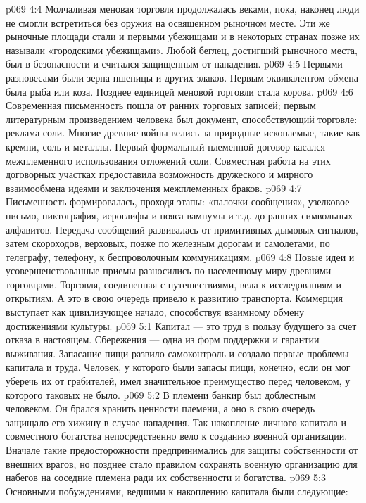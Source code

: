 \vs p069 4:4 Молчаливая меновая торговля продолжалась веками, пока, наконец люди не смогли встретиться без оружия на освященном рыночном месте. Эти же рыночные площади стали и первыми убежищами и в некоторых странах позже их называли «городскими убежищами». Любой беглец, достигший рыночного места, был в безопасности и считался защищенным от нападения.
\vs p069 4:5 \pc Первыми разновесами были зерна пшеницы и других злаков. Первым эквивалентом обмена была рыба или коза. Позднее единицей меновой торговли стала корова.
\vs p069 4:6 Современная письменность пошла от ранних торговых записей; первым литературным произведением человека был документ, способствующий торговле: реклама соли. Многие древние войны велись за природные ископаемые, такие как кремни, соль и металлы. Первый формальный племенной договор касался межплеменного использования отложений соли. Совместная работа на этих договорных участках предоставила возможность дружеского и мирного взаимообмена идеями и заключения межплеменных браков.
\vs p069 4:7 Письменность формировалась, проходя этапы: «палочки\hyp{}сообщения», узелковое письмо, пиктография, иероглифы и пояса\hyp{}вампумы и т.д. до ранних символьных алфавитов. Передача сообщений развивалась от примитивных дымовых сигналов, затем скороходов, верховых, позже по железным дорогам и самолетами, по телеграфу, телефону, к беспроволочным коммуникациям.
\vs p069 4:8 Новые идеи и усовершенствованные приемы разносились по населенному миру древними торговцами. Торговля, соединенная с путешествиями, вела к исследованиям и открытиям. А это в свою очередь привело к развитию транспорта. Коммерция выступает как цивилизующее начало, способствуя взаимному обмену достижениями культуры.
\vs p069 5:1 Капитал --- это труд в пользу будущего за счет отказа в настоящем. Сбережения --- одна из форм поддержки и гарантии выживания. Запасание пищи развило самоконтроль и создало первые проблемы капитала и труда. Человек, у которого были запасы пищи, конечно, если он мог уберечь их от грабителей, имел значительное преимущество перед человеком, у которого таковых не было.
\vs p069 5:2 В племени банкир был доблестным человеком. Он брался хранить ценности племени, а оно в свою очередь защищало его хижину в случае нападения. Так накопление личного капитала и совместного богатства непосредственно вело к созданию военной организации. Вначале такие предосторожности предпринимались для защиты собственности от внешних врагов, но позднее стало правилом сохранять военную организацию для набегов на соседние племена ради их собственности и богатства.
\vs p069 5:3 Основными побуждениями, ведшими к накоплению капитала были следующие:
